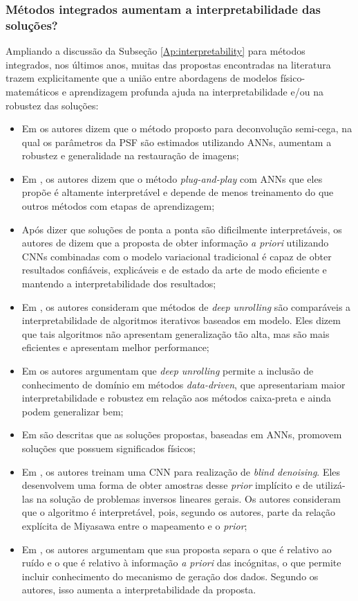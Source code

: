 \subsubsection{Métodos integrados aumentam a interpretabilidade das soluções?}
Ampliando a discussão da Subseção \ref{Ap:interpretability} para métodos integrados, nos últimos anos, muitas das propostas encontradas na literatura trazem explicitamente que a união entre abordagens de modelos físico-matemáticos e aprendizagem profunda ajuda na interpretabilidade e/ou na robustez das soluções:
\begin{itemize}
	\item  Em \cite{He2020} os autores dizem que o método proposto para deconvolução semi-cega, na qual os parâmetros da PSF são estimados utilizando ANNs, aumentam a robustez e generalidade na restauração de imagens;
	\item  Em \cite{Zhang2019plug}, os autores dizem que o método \textit{plug-and-play} com ANNs que eles propõe é altamente interpretável e depende de menos treinamento do que outros métodos com etapas de aprendizagem;
	\item Após dizer que soluções de ponta a ponta são dificilmente interpretáveis, os autores de \cite{Fang2020} dizem que a proposta de obter informação \textit{a priori} utilizando CNNs combinadas com o modelo variacional tradicional é capaz de obter resultados confiáveis, explicáveis e de estado da arte de modo eficiente e mantendo a interpretabilidade dos resultados; 
	\item Em \cite{Monga2021}, os autores consideram que métodos de \textit{deep unrolling} são comparáveis a interpretabilidade de algoritmos iterativos baseados em modelo. Eles dizem que tais algoritmos não apresentam generalização tão alta, mas são mais eficientes e apresentam melhor performance; 
	\item Em \cite{Dardikman20} os autores argumentam que \textit{deep unrolling} permite a inclusão de conhecimento de domínio em métodos \textit{data-driven}, que apresentariam maior interpretabilidade e robustez em relação aos métodos caixa-preta e ainda podem generalizar bem;
	\item Em \cite{Yang2020} são descritas que as soluções propostas, baseadas em ANNs, promovem soluções que possuem significados físicos;
	\item Em \cite{kadkhodaie2021solving}, os autores treinam uma CNN para realização de \textit{blind denoising}. Eles desenvolvem uma forma de obter amostras desse \textit{prior} implícito e de utilizá-las na solução de problemas inversos lineares gerais. Os autores consideram que o algoritmo é interpretável, pois, segundo os autores, parte da relação explícita de Miyasawa entre o mapeamento e o \textit{prior};
	
	\item Em \cite[pág. 4]{Li_2020}, os autores argumentam que sua proposta separa o que é relativo ao ruído e o que é relativo à informação \textit{a priori} das incógnitas, o que permite incluir conhecimento do mecanismo de geração dos dados. Segundo os autores, isso aumenta a interpretabilidade da proposta.
	\end{itemize}
